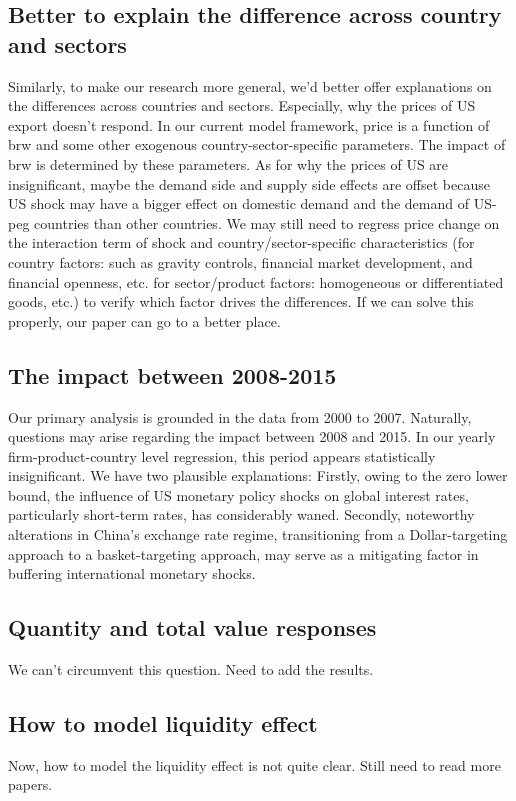 \documentclass[12pt]{article}
\begin{document}
\subsection{Better to explain the difference across country and sectors}

Similarly, to make our research more general, we'd better offer explanations on the differences across countries and sectors. Especially, why the prices of US export doesn't respond. In our current model framework, price is a function of brw and some other exogenous country-sector-specific parameters. The impact of brw is determined by these parameters. As for why the prices of US are insignificant, maybe the demand side and supply side effects are offset because US shock may have a bigger effect on domestic demand and the demand of US-peg countries than other countries. We may still need to regress price change on the interaction term of shock and country/sector-specific characteristics (for country factors: such as gravity controls, financial market development, and financial openness, etc. for sector/product factors: homogeneous or differentiated goods, etc.) to verify which factor drives the differences. 
If we can solve this properly, our paper can go to a better place.

\subsection{The impact between 2008-2015}
Our primary analysis is grounded in the data from 2000 to 2007. Naturally, questions may arise regarding the impact between 2008 and 2015. In our yearly firm-product-country level regression, this period appears statistically insignificant. We have two plausible explanations: Firstly, owing to the zero lower bound, the influence of US monetary policy shocks on global interest rates, particularly short-term rates, has considerably waned. Secondly, noteworthy alterations in China's exchange rate regime, transitioning from a Dollar-targeting approach to a basket-targeting approach, may serve as a mitigating factor in buffering international monetary shocks.

\subsection{Quantity and total value responses}
We can't circumvent this question. Need to add the results.

\subsection{How to model liquidity effect}
Now, how to model the liquidity effect is not quite clear. Still need to read more papers.


\newpage

\end{document}
